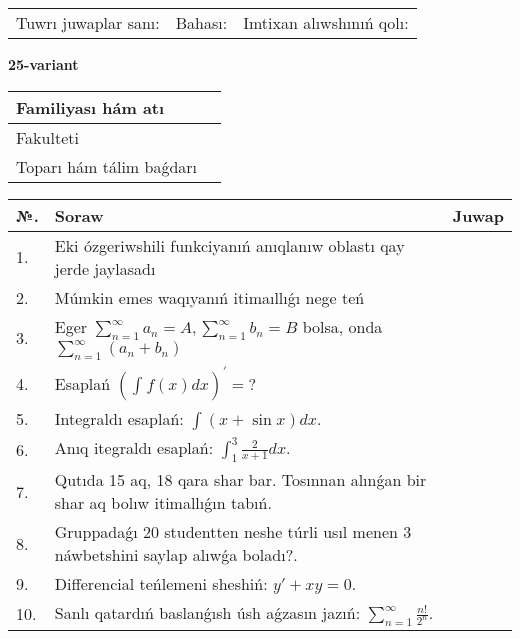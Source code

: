 \documentclass{article}
\begin{document}
\vspace{1cm}

\begin{tabular}{ c c c }
Tuwrı juwaplar sanı: \underline{\hspace{2cm}} & Bahası: \underline{\hspace{2cm}} & Imtixan alıwshınıń qolı: \underline{\hspace{2cm}} \\
\end{tabular}

\newpage

\begin{center}\textbf{25-variant}\end{center}

\bgroup
\def\arraystretch{1.5}
\begin{tabular}{ |m{6cm}|m{10cm}| }
  \hline
  Familiyası hám atı & \\
  \hline
  Fakulteti &\\
  \hline
  Toparı hám tálim baǵdarı & \\
  \hline
\end{tabular}
\egroup

\vspace{0.5cm}

\bgroup
\def\arraystretch{2}
\begin{tabular}{ |l|m{8cm}|m{7cm}| }
  \hline
  №. & Soraw & Juwap \\
  \hline
  1. & Eki ózgeriwshili funkciyanıń anıqlanıw oblastı qay jerde jaylasadı &  \\
  \hline
  2. & Múmkin emes waqıyanıń itimaıllıǵı nege teń &  \\
  \hline
  3. & Eger $\displaystyle\sum_{n = 1}^{\infty}a_{n} = A, \sum_{n = 1}^{\infty}b_{n} = B$ bolsa, onda $\displaystyle\sum_{n = 1}^{\infty}\left( a_{n} + b_{n} \right)$ &  \\
  \hline
  4. & Esaplań $\displaystyle \left( \int_{}^{}{f(x)dx} \right)^\prime = ?$ &  \\
  \hline
  5. & Integraldı esaplań: $\displaystyle\int (x + \sin x)dx$. &  \\
  \hline
  6. & Anıq itegraldı esaplań: $\displaystyle\int_{1}^{3}{\frac{2}{x + 1}dx}$. &  \\
  \hline
  7. & Qutıda 15 aq, 18 qara shar bar. Tosınnan alınǵan bir shar aq bolıw itimallıǵın tabıń. &  \\
  \hline
  8. & Gruppadaǵı 20 studentten neshe túrli usıl menen 3 náwbetshini saylap alıwǵa boladı?. &  \\
  \hline
  9. & Differencial teńlemeni sheshiń: $y' + xy = 0$. &  \\
  \hline
  10. & Sanlı qatardıń baslanǵısh úsh aǵzasın jazıń: $\displaystyle\sum_{n = 1}^{\infty}\frac{n!}{2^{n}}$. &  \\
  \hline
\end{tabular}
\egroup
\end{document}
